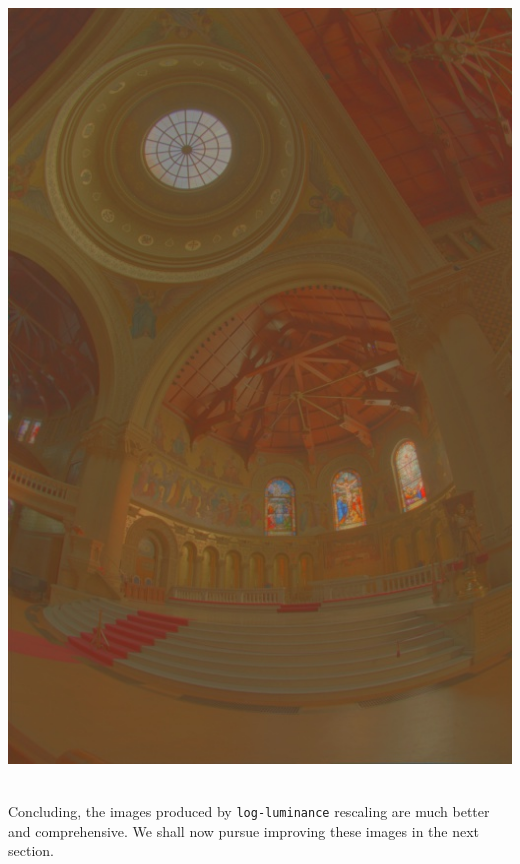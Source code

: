 \documentclass{article}
\begin{document}
\begin{itemize}
        \includegraphics[scale=.25]{./data/1/lgscl/b3.jpg}
    \end{itemize}
    \\
    Concluding, the images produced by \texttt{log-luminance} rescaling are much better and comprehensive. We shall now pursue improving these images in the next section.
    
    \pagebreak
\end{document}
